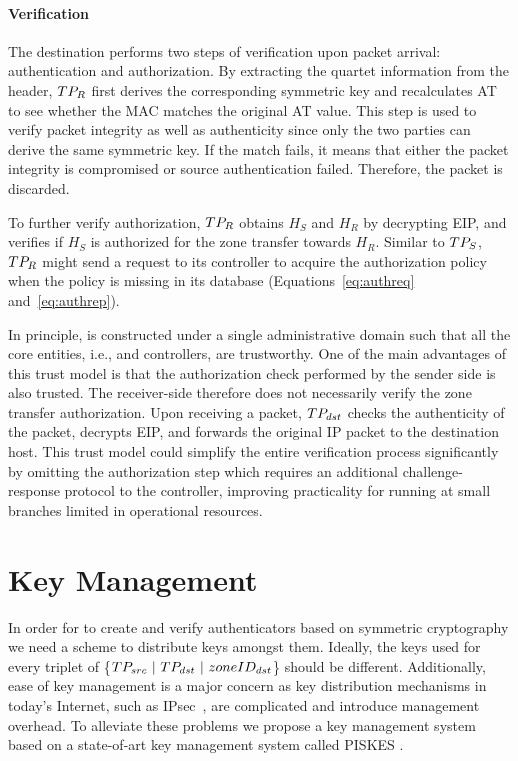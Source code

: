 

\paragraph{Verification}
The destination \tp performs two steps of verification upon packet arrival: authentication
and authorization. By extracting the quartet information from
the header, $TP_R$ first derives the corresponding symmetric key and recalculates AT to
see whether the MAC matches the original AT value. This step is used to verify packet
integrity as well as authenticity since only the two parties can derive the same
symmetric key. If the match fails, it means that either the packet integrity is compromised
or source authentication failed. Therefore, the packet is discarded.

To further verify authorization, $TP_R$ obtains $H_S$ and $H_R$ by decrypting EIP, and
verifies if $H_S$ is authorized for the zone transfer towards $H_R$. Similar to $TP_S$,
$TP_R$ might send a request to its controller to acquire the authorization policy when
the policy is missing in its database (Equations~\ref{eq:authreq} and~\ref{eq:authrep}).

In principle, \name is constructed under a single administrative domain such that all the
core entities, i.e., \tps and controllers, are trustworthy. One of the main advantages of
this trust model is that the authorization check performed by the sender side \tp is also
trusted. The receiver-side \tp therefore does not necessarily verify the zone transfer
authorization. Upon receiving a packet, $TP_{dst}$ checks the authenticity of the packet,
decrypts EIP, and forwards the original IP packet to the destination host. This trust
model could simplify the entire verification process significantly by omitting the
authorization step which requires an additional challenge-response protocol to the
controller, improving practicality for \tps running at small branches limited in
operational resources.

\section{Key Management}
\label{sec:keymanagement}

In order for \tps to create and verify authenticators based on symmetric cryptography 
we need a scheme to distribute keys amongst them. Ideally, the keys used for every 
triplet of \{$TP_{src}~|~TP_{dst}~|~zoneID_{dst}$\} should be different. Additionally, 
ease of key management is a major concern as key distribution mechanisms in today's 
Internet, such as IPsec~\cite{rfc2408,rfc2409,rfc4306}, are complicated and introduce 
management overhead. To alleviate these problems we propose a key management system 
based on a state-of-art key management system called PISKES \cite{rot2020piskes}.

